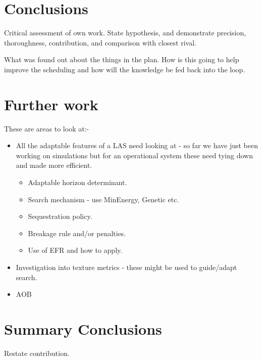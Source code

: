 \section{Conclusions}
Critical assessment of own work. State hypothesis, and demonstrate precision, thoroughness, contribution, and comparison with closest rival.

What was found out about the things in the plan. How is this going to help improve the scheduling and how will the knowledge be fed back into the loop.


\section{Further work}
These are areas to look at:-

\begin{itemize}
\item All the adaptable features of a LAS need looking at - so far we have just been working on simulations but for an operational system these need tying down and made more efficient.
\begin{itemize}
\item Adaptable horizon determinant.
\item Search mechanism - use MinEnergy, Genetic etc.
\item Sequestration policy.
\item Breakage rule and/or penalties.
\item Use of EFR and how to apply.
\end{itemize}
\item Investigation into texture metrics - these might be used to guide/adapt search.
\item AOB
\end{itemize}

\section{Summary Conclusions}
Restate contribution.
